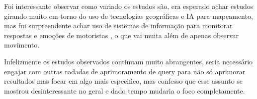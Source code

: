 Foi interessante observar como variado os estudos são, era esperado achar estudos girando muito em torno do uso de tecnologias geográficas e IA para mapeamento, mas fui surpreendente achar uso de sistemas de informação para monitorar respostas e emoções de motoristas , o que vai muita além de apenas observar movimento.

Infelizmente os estudos observados continuam muito abrangentes, seria necessário engajar com outras rodadas de aprimoramento de query para não só aprimorar resultados mas focar em algo mais especifico, mas confesso que esse assunto se mostrou desinteressante no geral e dado tempo mudaria o foco completamente.

